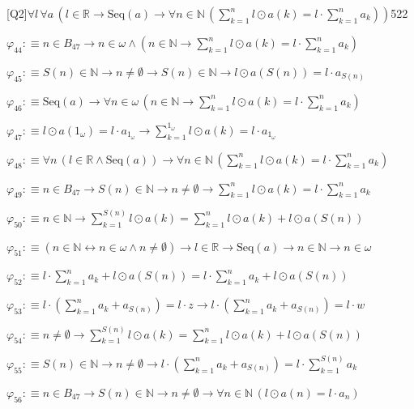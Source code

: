 \begin{fullproof}{[Q2]}{$\forall l\,\forall a\,(l \in \mathbb{R} \to \mathrm{Seq}(a) \to \forall n \in \mathbb{N}\,({\textstyle\sum_{k=1}^{n} l \odot a(k)} = l \cdot {\textstyle\sum_{k=1}^{n} a_{k}}))$}{522}
\begin{abbrevlist}
\item $\varphi_{44} :\equiv n \in B_{47} \to n \in \omega \land (n \in \mathbb{N} \to {\textstyle\sum_{k=1}^{n} l \odot a(k)} = l \cdot {\textstyle\sum_{k=1}^{n} a_{k}})$
\item $\varphi_{45} :\equiv S(n) \in \mathbb{N} \to n \neq \emptyset \to S(n) \in \mathbb{N} \to l \odot a(S(n)) = l \cdot a_{S(n)}$
\item $\varphi_{46} :\equiv \mathrm{Seq}(a) \to \forall n \in \omega\,(n \in \mathbb{N} \to {\textstyle\sum_{k=1}^{n} l \odot a(k)} = l \cdot {\textstyle\sum_{k=1}^{n} a_{k}})$
\item $\varphi_{47} :\equiv l \odot a(1_{\omega}) = l \cdot a_{1_{\omega}} \to {\textstyle\sum_{k=1}^{1_{\omega}} l \odot a(k)} = l \cdot a_{1_{\omega}}$
\item $\varphi_{48} :\equiv \forall n\,(l \in \mathbb{R} \land \mathrm{Seq}(a)) \to \forall n \in \mathbb{N}\,({\textstyle\sum_{k=1}^{n} l \odot a(k)} = l \cdot {\textstyle\sum_{k=1}^{n} a_{k}})$
\item $\varphi_{49} :\equiv n \in B_{47} \to S(n) \in \mathbb{N} \to n \neq \emptyset \to {\textstyle\sum_{k=1}^{n} l \odot a(k)} = l \cdot {\textstyle\sum_{k=1}^{n} a_{k}}$
\item $\varphi_{50} :\equiv n \in \mathbb{N} \to {\textstyle\sum_{k=1}^{S(n)} l \odot a(k)} = {\textstyle\sum_{k=1}^{n} l \odot a(k)} + l \odot a(S(n))$
\item $\varphi_{51} :\equiv (n \in \mathbb{N} \leftrightarrow n \in \omega \land n \neq \emptyset) \to l \in \mathbb{R} \to \mathrm{Seq}(a) \to n \in \mathbb{N} \to n \in \omega$
\item $\varphi_{52} :\equiv l \cdot {\textstyle\sum_{k=1}^{n} a_{k}} + l \odot a(S(n)) = l \cdot {\textstyle\sum_{k=1}^{n} a_{k}} + l \odot a(S(n))$
\item $\varphi_{53} :\equiv l \cdot ({\textstyle\sum_{k=1}^{n} a_{k}} + a_{S(n)}) = l \cdot z \to l \cdot ({\textstyle\sum_{k=1}^{n} a_{k}} + a_{S(n)}) = l \cdot w$
\item $\varphi_{54} :\equiv n \neq \emptyset \to {\textstyle\sum_{k=1}^{S(n)} l \odot a(k)} = {\textstyle\sum_{k=1}^{n} l \odot a(k)} + l \odot a(S(n))$
\item $\varphi_{55} :\equiv S(n) \in \mathbb{N} \to n \neq \emptyset \to l \cdot ({\textstyle\sum_{k=1}^{n} a_{k}} + a_{S(n)}) = l \cdot {\textstyle\sum_{k=1}^{S(n)} a_{k}}$
\item $\varphi_{56} :\equiv n \in B_{47} \to S(n) \in \mathbb{N} \to n \neq \emptyset \to \forall n \in \mathbb{N}\,(l \odot a(n) = l \cdot a_{n})$

\end{abbrevlist}
\end{fullproof}
